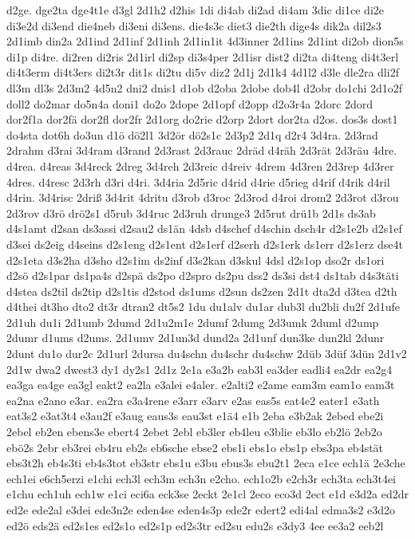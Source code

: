 {d2ge.
dge2ta
dge4t1e
d3gl
2d1h2
d2his
1di
di4ab
di2ad
di4am
3dic
di1ce
di2e
di3e2d
di3end
die4neb
di3eni
di3ens.
die4s3c
diet3
die2th
dige4s
dik2a
dil2s3
2d1imb
din2a
2d1ind
2d1inf
2d1inh
2d1in1it
4d3inner
2d1ins
2d1int
di2ob
dion5s
di1p
di4re.
di2ren
di2ris
2d1irl
di2sp
di3s4per
2d1isr
dist2
di2ta
di4teng
di4t3erl
di4t3erm
di4t3ers
di2t3r
dit1s
di2tu
di5v
diz2
2d1j
2d1k4
4d1l2
d3le
dle2ra
dli2f
dl3m
dl3s
2d3m2
4d5n2
dni2
dnis1
d1ob
d2oba
2dobe
dob4l
d2obr
do1chi
2d1o2f
doll2
do2mar
do5n4a
doni1
do2o
2dope
2d1opf
d2opp
d2o3r4a
2dorc
2dord
dor2f1a
dor2fä
dor2fl
dor2fr
2d1org
do2rie
d2orp
2dort
dor2ta
d2os.
dos3s
dost1
do4sta
dot6h
do3un
d1ö
dö2l1
3d2ör
dö2s1c
2d3p2
2d1q
d2r4
3d4ra.
2d3rad
2drahm
d3rai
3d4ram
d3rand
2d3rast
2d3rauc
2dräd
d4räh
2d3rät
2d3räu
4dre.
d4rea.
d4reas
3d4reck
2dreg
3d4reh
2d3reic
d4reiv
4drem
4d3ren
2d3rep
4d3rer
4dres.
d4resc
2d3rh
d3ri
d4ri.
3d4ria
2d5ric
d4rid
d4rie
d5rieg
d4rif
d4rik
d4ril
d4rin.
3d4risc
2driß
3d4rit
4dritu
d3rob
d3roc
2d3rod
d4roi
drom2
2d3rot
d3rou
2d3rov
d3rö
drö2s1
d5rub
3d4ruc
2d3ruh
drunge3
2d5rut
drü1b
2d1s
ds3ab
d4s1amt
d2san
ds3assi
d2sau2
ds1än
4dsb
d4schef
d4schin
dsch4r
d2s1e2b
d2s1ef
d3sei
ds2eig
d4seins
d2s1eng
d2s1ent
d2s1erf
d2serh
d2s1erk
ds1err
d2s1erz
dse4t
d2s1eta
d3s2ha
d3sho
d2s1im
ds2inf
d3s2kan
d3skul
4dsl
d2s1op
dso2r
ds1ori
d2sö
d2s1par
ds1pa4s
d2spä
ds2po
d2spro
ds2pu
dss2
ds3si
dst4
ds1tab
d4s3täti
d4stea
ds2til
ds2tip
d2s1tis
d2stod
ds1ums
d2sun
ds2zen
2d1t
dta2d
d3tea
d2th
d4thei
dt3ho
dto2
dt3r
dtran2
dt5s2
1du
du1alv
du1ar
dub3l
du2bli
du2f
2d1ufe
2d1uh
du1i
2d1umb
2dumd
2d1u2m1e
2dumf
2dumg
2d3umk
2duml
d2ump
2dumr
d1ums
d2ums.
2d1umv
2d1un3d
dund2a
2d1unf
dun3ke
dun2kl
2dunr
2dunt
du1o
dur2c
2d1url
2dursa
du4schn
du4schr
du4schw
2düb
3düf
3dün
2d1v2
2d1w
dwa2
dwest3
dy1
dy2s1
2d1z
2e1a
e3a2b
eab3l
ea3der
eadli4
ea2dr
ea2g4
ea3ga
ea4ge
ea3gl
eakt2
ea2la
e3alei
e4aler.
e2alti2
e2ame
eam3m
eam1o
eam3t
ea2na
e2ano
e3ar.
ea2ra
e3a4rene
e3arr
e3arv
e2as
eas5s
eat4e2
eater1
e3ath
eat3s2
e3at3t4
e3au2f
e3aug
eaus3s
eau3st
e1ä4
e1b
2eba
e3b2ak
2ebed
ebe2i
2ebel
eb2en
ebens3e
ebert4
2ebet
2ebl
eb3ler
eb4leu
e3blie
eb3lo
eb2lö
2eb2o
ebö2s
2ebr
eb3rei
eb4ru
eb2s
eb6sche
ebse2
ebs1i
ebs1o
ebs1p
ebs3pa
eb4stät
ebs3t2h
eb4s3ti
eb4s3tot
eb3str
ebs1u
e3bu
ebus3s
ebu2t1
2eca
e1ce
ech1ä
2e3che
ech1ei
e6ch5erzi
e1chi
ech3l
ech3m
ech3n
e2cho.
ech1o2b
e2ch3r
ech3ta
ech3t4ei
e1chu
ech1uh
ech1w
e1ci
eci6a
eck3se
2eckt
2e1cl
2eco
eco3d
2ect
e1d
e3d2a
ed2dr
ed2e
ede2al
e3dei
ede3n2e
eden4se
eden4s3p
ede2r
edert2
edi4al
edma3s2
e3d2o
ed2ö
eds2ä
ed2s1es
ed2s1o
ed2s1p
ed2s3tr
ed2su
edu2s
e3dy3
4ee
ee3a2
eeb2l
}
